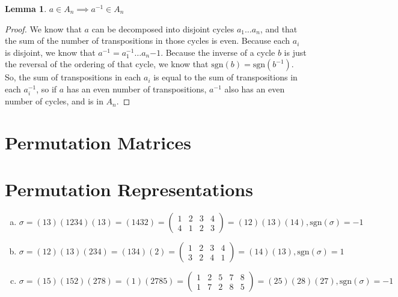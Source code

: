\documentclass[12pt]{article}
\newtheorem{lemma}{Lemma}
\begin{document}
\begin{lemma}
$a \in A_n \implies a^{-1} \in A_n$
\end{lemma}
\begin{proof}
We know that $a$ can be decomposed into disjoint cycles $a_1\ldots a_n$, and that the sum of the number of transpositions in those cycles is even. Because each $a_i$ is disjoint, we know that $a^{-1} = a_1^{-1}\ldots a_n{-1}$. Because the inverse of a cycle $b$ is just the reversal of the ordering of that cycle, we know that $\mathrm{sgn}(b) = \mathrm{sgn}(b^{-1})$. So, the sum of transpositions in each $a_i$ is equal to the sum of transpositions in each $a_i^{-1}$, so if $a$ has an even number of transpositions, $a^{-1}$ also has an even number of cycles, and is in $A_n$.
\end{proof}


\section{Permutation Matrices}


\section{Permutation Representations}
\begin{enumerate}[(a)]
\item $\sigma = (1 3)(1 2 3 4)(1 3) = (1 4 3 2) = \begin{pmatrix} 1 & 2 &3 &4\\ 4 &1 &2 &3 \end{pmatrix} = (12)(13)(14), \mathrm{sgn}(\sigma) = -1$ 
\item $\sigma = (1 2)(1 3)(2 3 4) = (1 3 4)(2) = \begin{pmatrix} 1 & 2 & 3 & 4 \\ 3 & 2 & 4 & 1 \end{pmatrix} = (14)(13), \mathrm{sgn}(\sigma) = 1$
\item $\sigma = (1 5)(1 5 2)(2 7 8) = (1)(2 7 8 5) = \begin{pmatrix} 1 & 2 & 5 & 7 & 8 \\ 1 & 7 & 2 & 8 & 5\end{pmatrix} = (2 5)(2 8)(2 7), \mathrm{sgn}(\sigma) = -1$
\end{enumerate}
\end{document}
